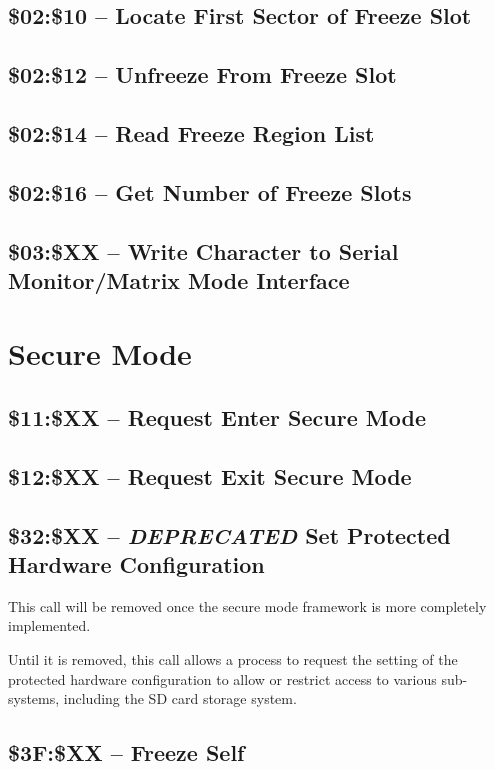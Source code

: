 \subsection{\$02:\$10 -- Locate First Sector of Freeze Slot}
\subsection{\$02:\$12 -- Unfreeze From Freeze Slot}
\subsection{\$02:\$14 -- Read Freeze Region List}
\subsection{\$02:\$16 -- Get Number of Freeze Slots}

\subsection{\$03:\$XX -- Write Character to Serial Monitor/Matrix Mode Interface}

\section{Secure Mode}

\subsection{\$11:\$XX -- Request Enter Secure Mode}
\subsection{\$12:\$XX -- Request Exit Secure Mode}
\subsection{\$32:\$XX -- {\em DEPRECATED} Set Protected Hardware Configuration}

This call will be removed once the secure mode framework is more completely implemented.

Until it is removed, this call allows a process to request the setting of the protected hardware configuration to allow or restrict access to various sub-systems, including the SD card storage system.

\subsection{\$3F:\$XX -- Freeze Self}

